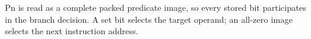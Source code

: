 Pn is read as a complete packed predicate image, so every stored bit
participates in the branch decision.  A set bit selects the target operand; an
all-zero image selects the next instruction address.
